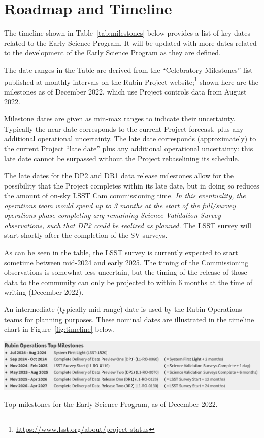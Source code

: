 \section{Roadmap and Timeline} \label{sec:timeline}

The timeline shown in Table~\ref{tab:milestones} below provides a list of key dates related to the Early Science Program.
It will be updated with more dates related to the development of the Early Science Program as they are defined.

The date ranges in the Table are derived from the ``Celebratory Milestones'' list published at monthly intervals on the Rubin Project website;\footnote{\url{https://www.lsst.org/about/project-status}} shown here are the milestones as of December 2022, which use Project controls data from August 2022.

Milestone dates are given as min-max ranges to indicate their uncertainty.
Typically the near date corresponds to the current Project forecast, plus any additional operational uncertainty.
The late date corresponds (approximately) to the current Project ``late date'' plus any additional operational uncertainty: this late date cannot be surpassed without the Project rebaselining its schedule.

The late dates for the DP2 and DR1 data release milestones allow for the possibility that the Project completes within its late date, but in doing so reduces the amount of on-sky LSST Cam commissioning time.
{\it In this eventuality, the operations team would spend up to 3 months at the start of the full/survey operations phase completing any remaining Science Validation Survey observations, such that DP2 could be realized as planned.}
The LSST survey will start shortly after the completion of the SV surveys.

As can be seen in the table, the LSST survey is currently expected to start sometime between mid-2024 and early 2025.
The timing of the Commissioning observations is somewhat less uncertain, but the timing of the release of those data to the community can only be projected to within 6 months at the time of writing (December 2022).

An intermediate (typically mid-range) date is used by the Rubin Operations teams for planning purposes. These nominal dates are illustrated in the timeline chart in Figure~\ref{fig:timeline} below.

\begin{table}
\label{tab:milestones}
\includegraphics[width=\linewidth]{figures/DPR-milestones}
\caption{Top milestones for the Early Science Program, as of December 2022.}
\end{table}

